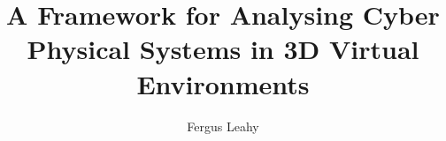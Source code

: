 \documentclass[a4paper,11pt,twoside,openright]{report}
\begin{document}
\title{\LARGE {\bf A Framework for Analysing Cyber Physical Systems in 3D Virtual Environments}\\
 \vspace*{6mm}
}

\author{Fergus Leahy}

\normallinespacing
\maketitle

\preface





\body












\appendix




\end{document}
